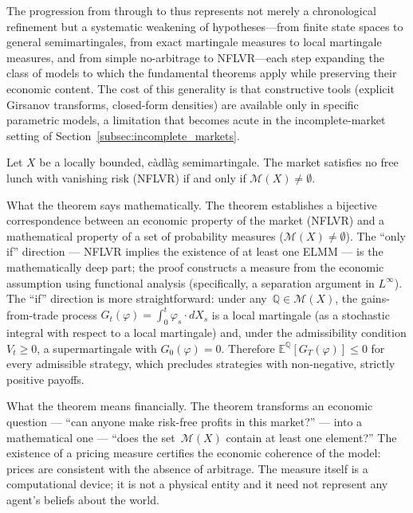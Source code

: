 The progression from \citet{HarrisonKreps1979} through
\citet{HarrisonPliska1981} to \citet{DelbaenSchachermayer1994} thus
represents not merely a chronological refinement but a systematic
weakening of hypotheses---from finite state spaces to general
semimartingales, from exact martingale measures to local martingale
measures, and from simple no-arbitrage to NFLVR---each step expanding
the class of models to which the fundamental theorems apply while
preserving their economic content.  The cost of this generality is that
constructive tools (explicit Girsanov transforms, closed-form densities)
are available only in specific parametric models, a limitation that
becomes acute in the incomplete-market setting of
Section~\ref{subsec:incomplete_markets}.

\begin{theorem}
\label{thm:FTAP1}
Let $X$ be a locally bounded, c\`{a}dl\`{a}g semimartingale.  The
market satisfies no free lunch with vanishing risk (NFLVR) if and only
if $\mathcal{M}(X) \neq \emptyset$.
\end{theorem}

\noindent What the theorem says mathematically.
The theorem establishes a bijective correspondence between an economic
property of the market (NFLVR) and a mathematical property of a set
of probability measures ($\mathcal{M}(X) \neq \emptyset$).  The ``only
if'' direction --- NFLVR implies the existence of at least one ELMM ---
is the mathematically deep part; the proof constructs a measure from the
economic assumption using functional analysis (specifically, a separation
argument in $L^\infty$).  The ``if'' direction is more straightforward:
under any~$\mathbb{Q} \in \mathcal{M}(X)$, the gains-from-trade process
$G_t(\varphi) = \int_0^t \varphi_s \cdot dX_s$ is a local martingale (as
a stochastic integral with respect to a local martingale) and, under the
admissibility condition $V_t \ge 0$, a supermartingale with
$G_0(\varphi) = 0$.  Therefore
$\mathbb{E}^{\mathbb{Q}}[G_T(\varphi)] \le 0$ for every admissible
strategy, which precludes strategies with non-negative, strictly positive
payoffs.

\noindent What the theorem means financially.
The theorem transforms an economic question --- ``can anyone make
risk-free profits in this market?'' --- into a mathematical one ---
``does the set~$\mathcal{M}(X)$ contain at least one element?''  The
existence of a pricing measure certifies the economic coherence of the
model: prices are consistent with the absence of arbitrage.  The measure
itself is a computational device; it is not a physical entity and it need
not represent any agent's beliefs about the world.

